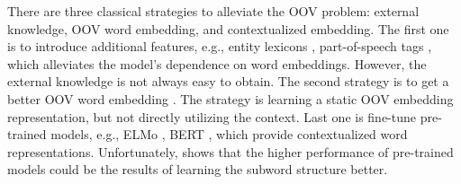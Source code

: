 \documentclass[11pt]{article}
\begin{document}
\begin{table}[t]
\centering
\small
\renewcommand\arraystretch{1.2}
\caption{The comparison between the in-dictionary and out-of-dictionary parts of the CoNLL 2003 baseline \cite{lin-etal-2020-rigorous}, which was tested on Bert-CRF. It is obvious that the performance gap between InDict and OutDict is significantly large.}
\label{tab:result}
\end{table}


There are three classical strategies to alleviate the OOV problem: external knowledge, OOV word embedding, and contextualized embedding. The first one is to introduce additional features, e.g., entity lexicons \cite{zhang-yang-2018-chinese}, part-of-speech tags \cite{li-etal-2018-self}, which alleviates the model's dependence on word embeddings. However, the external knowledge is not always easy to obtain. The second strategy is to get a better OOV word embedding \cite{peng2019learning,fukuda-etal-2020-robust}. The strategy is learning a static OOV embedding representation, but not directly utilizing the context. Last one is fine-tune pre-trained models,  e.g., ELMo \cite{peters-etal-2018-deep}, BERT \cite{devlin2018bert}, which provide contextualized word representations. Unfortunately, \citet{agarwal2021interpretability} shows that the higher performance of pre-trained models could be the results of learning the subword structure better. 
\end{document}
